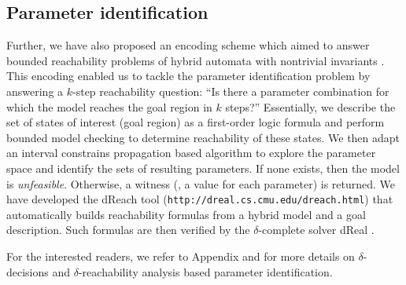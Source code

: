 \subsection{Parameter identification}
Further, we have also proposed an encoding scheme which aimed to answer bounded reachability problems of hybrid automata with nontrivial invariants \cite{liu14}. This encoding enabled us to tackle the parameter identification problem by answering a $k$-step reachability question: ``Is there a parameter
combination for which the model reaches the goal region in $k$ steps?'' Essentially, we describe the set of states of interest (goal region) as a first-order logic formula and perform bounded model checking \cite{BMC} to determine reachability of these states. We then adapt an interval constrains propagation based algorithm to explore the parameter space and identify the sets of resulting parameters. If none exists, then the model is 
{\em unfeasible}. Otherwise, a witness (\ie, a value for each parameter) is returned. We have developed the dReach tool (\verb#http://dreal.cs.cmu.edu/dreach.html#) that automatically builds reachability formulas from a hybrid model and a goal description. Such formulas are then verified by the $\delta$-complete solver dReal \citep{dreal}.

For the interested readers, we refer to Appendix and \cite{liu14} for more details on $\delta$-decisions and $\delta$-reachability analysis based parameter identification.

